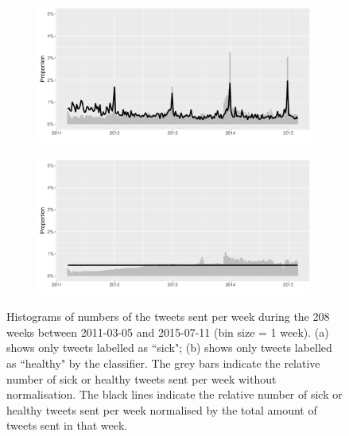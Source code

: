\documentclass[11pt, a4paper,twoside]{report}\usepackage[]{graphicx}\usepackage[]{color}
\begin{document}
\begin{figure}[H]
\centering
  \begin{subfigure}[t]{1\textwidth}
  \includegraphics[width=1\linewidth]{12B_activity_sick_user_date_Twitter_full_aggregatedoverlay.pdf}
  \caption{}
  \end{subfigure}
  
  \bigskip 

    \begin{subfigure}[t]{1\textwidth}
  \includegraphics[width=1\linewidth]{13B_activity_healthy_user_date_Twitter_full_aggregatedoverlay.pdf}
  \caption{}
  \end{subfigure}
  \caption{Histograms of numbers of the tweets sent per week during the 208 weeks between 2011-03-05 and 2015-07-11 (bin size = 1 week). (a) shows only tweets labelled as ``sick"; (b) shows only tweets labelled as ``healthy" by the classifier. The grey bars indicate the relative number of sick or healthy tweets sent per week without normalisation. The black lines indicate the relative number of sick or healthy tweets sent per week normalised by the total amount of tweets sent in that week.}
  \label{fig:tweets_seasonal_healthy_sick_user}
\end{figure}
\end{document}
